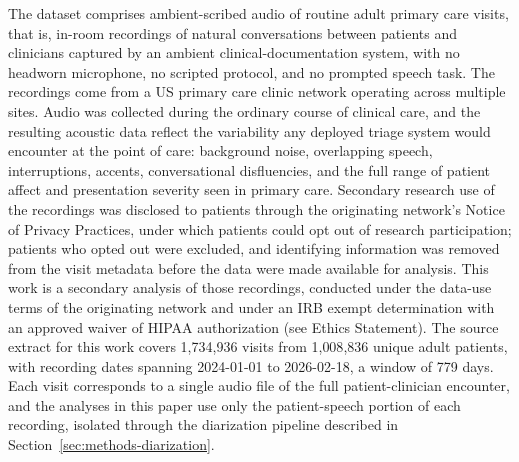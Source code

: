 \documentclass[utf8]{FrontiersinHarvard} %
\begin{document}
The dataset comprises ambient-scribed audio of routine adult primary care visits, that is, in-room recordings of natural conversations between patients and clinicians captured by an ambient clinical-documentation system, with no headworn microphone, no scripted protocol, and no prompted speech task. The recordings come from a US primary care clinic network operating across multiple sites. Audio was collected during the ordinary course of clinical care, and the resulting acoustic data reflect the variability any deployed triage system would encounter at the point of care: background noise, overlapping speech, interruptions, accents, conversational disfluencies, and the full range of patient affect and presentation severity seen in primary care. Secondary research use of the recordings was disclosed to patients through the originating network's Notice of Privacy Practices, under which patients could opt out of research participation; patients who opted out were excluded, and identifying information was removed from the visit metadata before the data were made available for analysis. This work is a secondary analysis of those recordings, conducted under the data-use terms of the originating network and under an IRB exempt determination with an approved waiver of HIPAA authorization (see Ethics Statement). The source extract for this work covers 1{,}734{,}936 visits from 1{,}008{,}836 unique adult patients, with recording dates spanning 2024-01-01 to 2026-02-18, a window of 779 days. Each visit corresponds to a single audio file of the full patient-clinician encounter, and the analyses in this paper use only the patient-speech portion of each recording, isolated through the diarization pipeline described in Section~\ref{sec:methods-diarization}.
\end{document}
